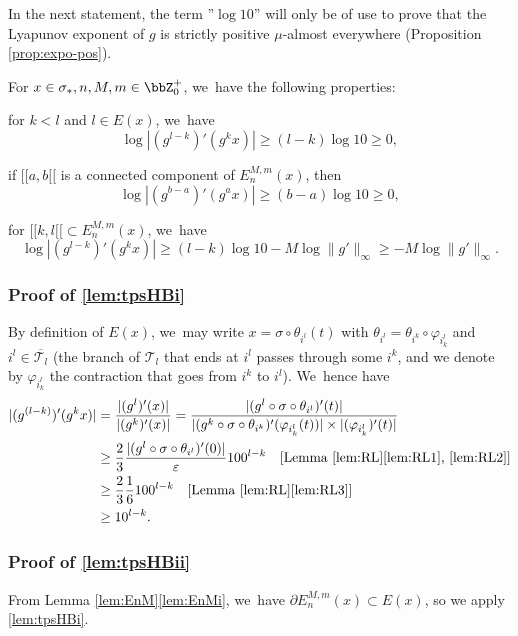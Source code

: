 In the next statement, the term ''$\log 10$'' will only be of use to prove that the Lyapunov exponent of $g$ is strictly positive $\mu$-almost everywhere (Proposition \ref{prop:expo-pos}).

\pagebreak[2]
\begin{lem}
\label{lem:tpsHB}
For $x \in \sigma_*, n, M,m \in \bbZ_0^+$, we~have the following properties:
\begin{enumeratei}
\item\label{lem:tpsHBi}
 for $k < l$ and $l \in E(x)$, we~have
\[
\log |(g^{l-k})'(g^k x)| \geq (l-k) \log 10 \geq 0,
\]
\item\label{lem:tpsHBii}
 if $[\![ a, b [\![$ is a connected component of $E_n^{M,m}(x)$, then
\[
\log |(g^{b-a})'(g^a x)| \geq (b-a) \log 10 \geq 0,
\]
\item\label{lem:tpsHBiii}
 for $[\![ k, l [\![ \subset E_n^{M,m}(x)$, we~have
\[
\log |(g^{l-k})'(g^k x)| \geq (l-k) \log 10 - M \log \| g' \|_{\infty} \geq - M \log \| g' \|_{\infty}.
\]
\end{enumeratei}
\end{lem}

\subsubsection*{Proof of \eqref{lem:tpsHBi}}
By definition of $E(x)$, we~may write $x = \sigma \circ \theta_{i^l}(t)$ with $\theta_{i^l} = \theta_{i^k} \circ \varphi_{i_k^l}$ and $i^l \in \overline{\mathcal{T}_l}$ (\ie the branch of $\mathcal{T}_l$ that ends at $i^l$ passes through some $i^k$, and we denote by $\varphi_{i_k^l}$ the contraction that goes from $i^k$ to $i^l$). We~hence have
\begin{align*}
|(g^{(l-k)})'(g^k x) | &= \frac{| (g^l)'(x) |}{| (g^k)'(x) |} = \frac{| (g^l \circ \sigma \circ \theta_{i^l})'(t) |}{| (g^k \circ \sigma \circ \theta_{i^k})'(\varphi_{i_k^l}(t)) | \times | (\varphi_{i_k^l})'(t) |}\\
&\geq \frac{2}{3} \frac{| (g^l \circ \sigma \circ \theta_{i^l})'(0) |}{\varepsilon} 100^{l-k}\quad[\text{Lemma~\ref{lem:RL}\eqref{lem:RL1}, \eqref{lem:RL2}}]\\
&\geq \frac{2}{3} \frac{1}{6} 100^{l-k}\quad[\text{Lemma~\ref{lem:RL}\eqref{lem:RL3}}]\\
&\geq 10^{l-k}.
\end{align*}

\subsubsection*{Proof of \eqref{lem:tpsHBii}}
From Lemma \ref{lem:EnM}\eqref{lem:EnMi}, we~have $\partial E_n^{M,m}(x) \subset E(x)$, so we apply \eqref{lem:tpsHBi}.

